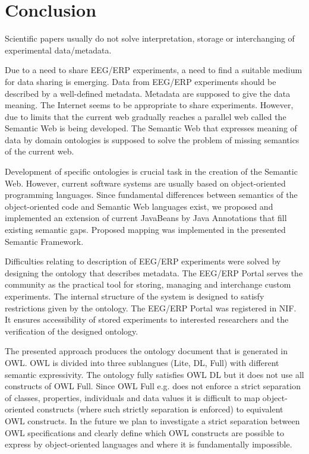 \documentclass[conference]{IEEEtran}
\begin{document}
\section{Conclusion}


Scientific papers usually do not solve interpretation, storage or interchanging of experimental data/metadata.

Due to a need to share EEG/ERP experiments, a need to find a suitable medium for data sharing is emerging. Data from EEG/ERP experiments should be described by a well-defined metadata. Metadata are supposed to give the data meaning. The Internet seems to be appropriate to share experiments. However, due to limits that the current web gradually reaches a parallel web called the Semantic Web is being developed. The Semantic Web that expresses meaning of data by domain ontologies is supposed to solve the problem of missing semantics of the current web.

Development of specific ontologies is crucial task in the creation of the Semantic Web. However, current software systems are usually based on object-oriented programming languages. Since fundamental differences between semantics of the object-oriented code and Semantic Web languages exist, we proposed and implemented an extension of current JavaBeans by Java Annotations that fill existing semantic gaps. Proposed mapping was implemented in the presented Semantic Framework.

Difficulties relating to description of EEG/ERP experiments were solved by designing the ontology that describes metadata. The EEG/ERP Portal serves the community as the practical tool for storing, managing and interchange custom experiments. The internal structure of the system is designed to satisfy restrictions given by the ontology. The EEG/ERP Portal was registered in NIF. It ensures accessibility of stored experiments to interested researchers and the verification of the designed ontology.

The presented approach produces the ontology document that is generated in OWL. OWL is divided into three sublangues (Lite, DL, Full) with different semantic expressivity. The ontology fully satisfies OWL DL but it does not use all constructs of OWL Full. Since OWL Full e.g. does not enforce a strict separation of classes, properties, individuals and data values it is difficult to map object-oriented constructs (where such strictly separation is enforced) to equivalent OWL constructs. In the future we plan to investigate a strict separation between OWL specifications and clearly define which OWL constructs are possible to express by object-oriented languages and where it is fundamentally impossible.
\end{document}
